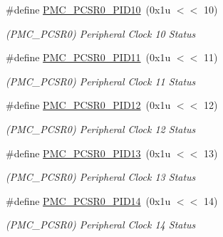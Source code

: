 \begin{DoxyCompactItemize}
\mbox{\label{group__SAMS70__PMC_gae545f7dc0353b4cf88af68fa9485ef68}} 
\#define \mbox{\hyperlink{group__SAMS70__PMC_gae545f7dc0353b4cf88af68fa9485ef68}{P\+M\+C\+\_\+\+P\+C\+S\+R0\+\_\+\+P\+I\+D10}}~(0x1u $<$$<$ 10)
\begin{DoxyCompactList}\small\item\em (P\+M\+C\+\_\+\+P\+C\+S\+R0) Peripheral Clock 10 Status \end{DoxyCompactList}\item 
\mbox{\label{group__SAMS70__PMC_ga50a5281db7e153aba3eb684fa9ed8c08}} 
\#define \mbox{\hyperlink{group__SAMS70__PMC_ga50a5281db7e153aba3eb684fa9ed8c08}{P\+M\+C\+\_\+\+P\+C\+S\+R0\+\_\+\+P\+I\+D11}}~(0x1u $<$$<$ 11)
\begin{DoxyCompactList}\small\item\em (P\+M\+C\+\_\+\+P\+C\+S\+R0) Peripheral Clock 11 Status \end{DoxyCompactList}\item 
\mbox{\label{group__SAMS70__PMC_ga9aca76ffce362c706493978431ce1106}} 
\#define \mbox{\hyperlink{group__SAMS70__PMC_ga9aca76ffce362c706493978431ce1106}{P\+M\+C\+\_\+\+P\+C\+S\+R0\+\_\+\+P\+I\+D12}}~(0x1u $<$$<$ 12)
\begin{DoxyCompactList}\small\item\em (P\+M\+C\+\_\+\+P\+C\+S\+R0) Peripheral Clock 12 Status \end{DoxyCompactList}\item 
\mbox{\label{group__SAMS70__PMC_ga01eac87ecf73e7ee98d611510a8837f0}} 
\#define \mbox{\hyperlink{group__SAMS70__PMC_ga01eac87ecf73e7ee98d611510a8837f0}{P\+M\+C\+\_\+\+P\+C\+S\+R0\+\_\+\+P\+I\+D13}}~(0x1u $<$$<$ 13)
\begin{DoxyCompactList}\small\item\em (P\+M\+C\+\_\+\+P\+C\+S\+R0) Peripheral Clock 13 Status \end{DoxyCompactList}\item 
\mbox{\label{group__SAMS70__PMC_ga3d29d6cfbb023335de514a64a26c1ee4}} 
\#define \mbox{\hyperlink{group__SAMS70__PMC_ga3d29d6cfbb023335de514a64a26c1ee4}{P\+M\+C\+\_\+\+P\+C\+S\+R0\+\_\+\+P\+I\+D14}}~(0x1u $<$$<$ 14)
\begin{DoxyCompactList}\small\item\em (P\+M\+C\+\_\+\+P\+C\+S\+R0) Peripheral Clock 14 Status \end{DoxyCompactList}\item 
$$
\end{DoxyCompactItemize}
